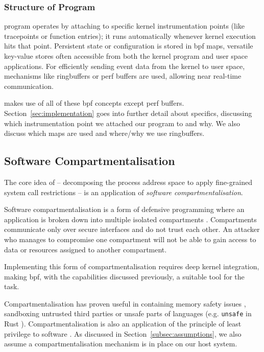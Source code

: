 \subsubsection{Structure of  Program}

 program operates by attaching to specific kernel instrumentation
points (like tracepoints or function entries); it runs automatically
whenever kernel execution hits that point. Persistent state or configuration
is stored in \ac{bpf} maps, versatile key-value stores often accessible from both
the kernel program and user space applications. For efficiently sending
event data from the kernel to user space, mechanisms like ringbuffers or
perf buffers are used, allowing near real-time communication.

\af makes use of all of these \ac{bpf} concepts except perf buffers.
Section~\ref{sec:implementation} goes into further detail about specifics,
discussing which instrumentation point we attached our program to and why. We
also discuss which maps are used and where/why we use ringbuffers.

\subsection{Software Compartmentalisation}

The core idea of \af – decomposing the process address space to apply 
fine-grained system call restrictions – is an application of \textit{software
compartmentalisation}. 

Software compartmentalisation is a form of defensive programming where an application
is broken down into multiple isolated compartments \cite{SOK}. Compartments
communicate only over secure interfaces and do not trust each other. An
attacker who manages to compromise one compartment will not be able to gain
access to data or resources assigned to another compartment.  

Implementing this form of compartmentalisation requires deep kernel
integration, making \ac{bpf}, with the capabilities discussed previously, a 
suitable tool for the task.  

Compartmentalisation has proven useful in containing memory safety issues
\cite{CONFFUZZ}, sandboxing untrusted third parties \cite{ANDROID_SOK} or
unsafe parts of languages \cite{MPK} (e.g. \texttt{unsafe} in Rust 
\cite{rustbook_unsafe}). Compartmentalisation is also an application of the
principle of least privilege to software \cite{PRIVMAN}. As discussed in 
Section~\ref{subsec:assumptions}, we also assume a compartmentalisation
mechanism is in place on our host system.

